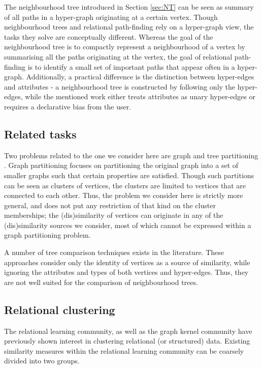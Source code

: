 The neighbourhood tree introduced in Section \ref{sec:NT} can be seen as summary of all paths in a hyper-graph originating at a certain vertex.
Though neighbourhood trees and relational path-finding rely on a hyper-graph view, the tasks they solve are conceptually different.
Whereas the goal of the neighbourhood tree is to compactly represent a neighbourhood of a vertex by summarising all the paths originating at the vertex, the goal of relational path-finding is to identify a small set of important paths that appear often in a hyper-graph.
Additionally, a practical difference is the distinction between hyper-edges and attributes - a neighbourhood tree is constructed by following only the hyper-edges, while the mentioned work either treats attributes as unary hyper-edges or requires a declarative bias from the user.


\subsection{Related tasks}

Two problems related to the one we consider here are graph and tree partitioning \cite{bader2012dimacs}.
Graph partitioning focuses on partitioning the original graph into a set of smaller graphs such that certain properties are satisfied.
Though such partitions can be seen as clusters of vertices, the clusters are limited to vertices that are connected to each other.
Thus, the problem we consider here is strictly more general, and does not put any restriction of that kind on the cluster memberships; the (dis)similarity of vertices can originate in any of the (dis)similarity sources we consider, most of which cannot be expressed within a graph partitioning problem.



A number of tree comparison techniques \cite{Bille:2005} exists in the literature.
These approaches consider only the identity of vertices as a source of similarity, while ignoring the attributes and types of both vertices and hyper-edges.
Thus, they are not well suited for the comparison of neighbourhood trees.



\subsection{Relational clustering}
\label{sec:RelClust}

The relational learning community, as well as the graph kernel community have previously shown interest in clustering relational (or structured) data.
Existing similarity measures within the relational learning community can be coarsely divided into two groups.


